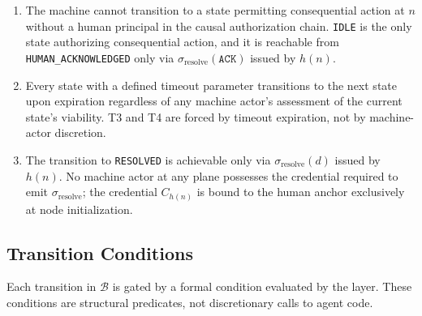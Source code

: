 \begin{enumerate}
\itemsep=0pt
\item[\textbf{(SP-1) Non-regression.}] The machine cannot transition to a state permitting consequential action at $n$ without a human principal in the causal authorization chain. \texttt{IDLE} is the only state authorizing consequential action, and it is reachable from \texttt{HUMAN\_ACKNOWLEDGED} only via $\sigma_{\text{resolve}}(\texttt{ACK})$ issued by $h(n)$.

\item[\textbf{(SP-2) Timeout-forced progression.}] Every state with a defined timeout parameter transitions to the next state upon expiration regardless of any machine actor's assessment of the current state's viability. T3 and T4 are forced by timeout expiration, not by machine-actor discretion.

\item[\textbf{(SP-3) Human-only resolution.}] The transition to \texttt{RESOLVED} is achievable only via $\sigma_{\text{resolve}}(d)$ issued by $h(n)$. No machine actor at any plane possesses the credential required to emit $\sigma_{\text{resolve}}$; the credential $C_{h(n)}$ is bound to the human anchor exclusively at node initialization.
\end{enumerate}

\subsection{Transition Conditions}
\label{sec:bp-transitions-conditions}

Each transition in $\mathcal{B}$ is gated by a formal condition evaluated by the \fact{} layer. These conditions are structural predicates, not discretionary calls to agent code.

